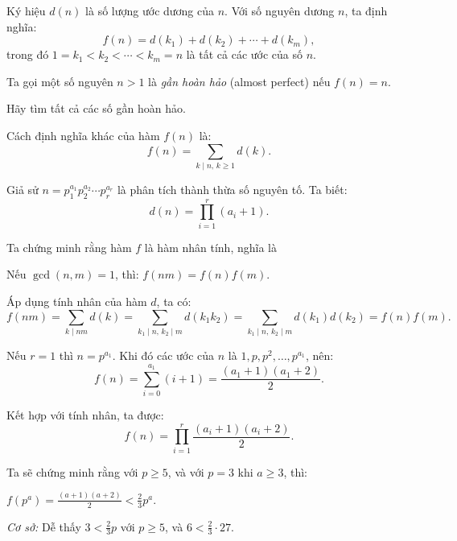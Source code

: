 \ifshowproblemandsoln
\ifshowproblem\begin{problem}\label{problem:EMC-2015-J-P3}\fi
\ifshowsoln\begin{problem}\fi
    Ký hiệu \( d(n) \) là số lượng ước dương của \( n \).  
    Với số nguyên dương \( n \), ta định nghĩa:
    \[
        f(n) = d(k_1) + d(k_2) + \cdots + d(k_m),
    \]
    trong đó \( 1 = k_1 < k_2 < \cdots < k_m = n \) là tất cả các ước của số \( n \).
    
    Ta gọi một số nguyên \( n > 1 \) là \textit{gần hoàn hảo} (almost perfect) nếu \( f(n) = n \).
    
    Hãy tìm tất cả các số gần hoàn hảo.    
\end{problem}
\fi

\ifshowsoln
\begin{soln}\footnotemark

    Cách định nghĩa khác của hàm \( f(n) \) là:
    \[
        f(n) = \sum_{k \mid n,\, k \ge 1} d(k).
    \]
    
    Giả sử \( n = p_1^{a_1} p_2^{a_2} \cdots p_r^{a_r} \) là phân tích thành thừa số nguyên tố. Ta biết:
    \[
        d(n) = \prod_{i=1}^r (a_i + 1).
    \]

    Ta chứng minh rằng hàm \( f \) là hàm nhân tính, nghĩa là
    \begin{claim*}
        Nếu \( \gcd(n, m) = 1 \), thì: $f(nm) = f(n)f(m).$
    \end{claim*}
    \begin{subproof}
        Áp dụng tính nhân của hàm \( d \), ta có:
        \[
            f(nm) = \sum_{k \mid nm} d(k) = \sum_{k_1 \mid n,\, k_2 \mid m} d(k_1 k_2) = \sum_{k_1 \mid n,\, k_2 \mid m} d(k_1)d(k_2) = f(n)f(m).
        \]
    \end{subproof}

    Nếu \( r = 1 \) thì \( n = p^{a_1} \). Khi đó các ước của \( n \) là \( 1, p, p^2, \ldots, p^{a_1} \), nên:
    \[
        f(n) = \sum_{i = 0}^{a_1} (i + 1) = \frac{(a_1 + 1)(a_1 + 2)}{2}.
    \]

    Kết hợp với tính nhân, ta được:
    \[
        f(n) = \prod_{i = 1}^r \frac{(a_i + 1)(a_i + 2)}{2}.
    \]

    Ta sẽ chứng minh rằng với \( p \ge 5 \), và với \( p = 3 \) khi \( a \ge 3 \), thì:
    \begin{claim*}
        $f(p^a) = \frac{(a+1)(a+2)}{2} < \frac{2}{3}p^a.$
    \end{claim*}
    \begin{subproof}
        \textit{Cơ sở:} Dễ thấy \( 3 < \frac{2}{3}p \) với \( p \ge 5 \), và \( 6 < \frac{2}{3} \cdot 27 \).


\end{subproof}
\end{soln}
\end{problem}
